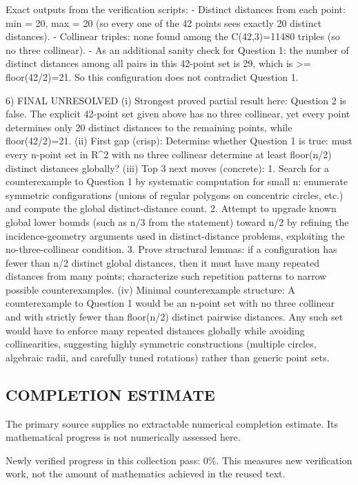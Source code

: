 Exact outputs from the verification scripts:
- Distinct distances from each point: min = 20, max = 20 (so every one of the 42 points sees exactly 20 distinct distances).
- Collinear triples: none found among the C(42,3)=11480 triples (so no three collinear).
- As an additional sanity check for Question 1: the number of distinct distances among all pairs in this 42-point set is 29, which is >= floor(42/2)=21. So this configuration does not contradict Question 1.

6) FINAL
UNRESOLVED
(i) Strongest proved partial result here: Question 2 is false. The explicit 42-point set given above has no three collinear, yet every point determines only 20 distinct distances to the remaining points, while floor(42/2)=21.
(ii) First gap (crisp): Determine whether Question 1 is true: must every n-point set in R^2 with no three collinear determine at least floor(n/2) distinct distances globally?
(iii) Top 3 next moves (concrete):
  1. Search for a counterexample to Question 1 by systematic computation for small n: enumerate symmetric configurations (unions of regular polygons on concentric circles, etc.) and compute the global distinct-distance count.
  2. Attempt to upgrade known global lower bounds (such as n/3 from the statement) toward n/2 by refining the incidence-geometry arguments used in distinct-distance problems, exploiting the no-three-collinear condition.
  3. Prove structural lemmas: if a configuration has fewer than n/2 distinct global distances, then it must have many repeated distances from many points; characterize such repetition patterns to narrow possible counterexamples.
(iv) Minimal counterexample structure: A counterexample to Question 1 would be an n-point set with no three collinear and with strictly fewer than floor(n/2) distinct pairwise distances. Any such set would have to enforce many repeated distances globally while avoiding collinearities, suggesting highly symmetric constructions (multiple circles, algebraic radii, and carefully tuned rotations) rather than generic point sets.


\subsection*{COMPLETION ESTIMATE}
The primary source supplies no extractable numerical completion estimate. Its mathematical progress is not numerically assessed here.

Newly verified progress in this collection pass: $0\%$. This measures new verification work, not the amount of mathematics achieved in the reused text.

